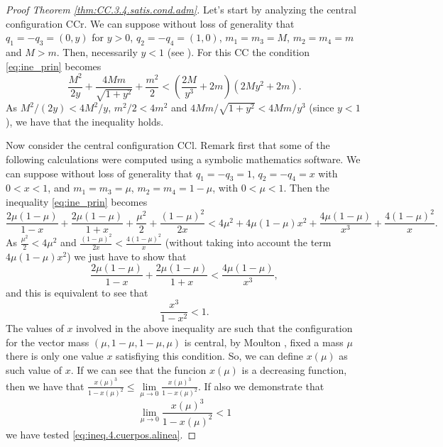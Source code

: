 \documentclass[twoside]{article}
\theoremstyle{remark}
\begin{document}
\begin{proof}[Proof Theorem \ref{thm:CC.3.4.satis.cond.adm}]

Let's start by analyzing the central configuration CCr. We can suppose without loss of generality that $ q_1 = -q_3 = (0, y) $ for $ y> 0 $, $ q_2 = -q_4 = (1,0) $, $ m_1 = m_3 = M $, $ m_2 = m_4 = m $ and $ M> m $. Then, necessarily $ y <1 $ (see \cite{perez2007convex}). For this CC  the condition \eqref{eq:ine_prin} becomes
\[\frac{M^2}{2y}+\frac{4Mm}{\sqrt{1+y^2}}+\frac{m^2}{2}<\left(\frac{2M}{y^3}+2m\right) \left(2My^2+2m\right).\]
As $M^2/(2y)<4M^2/y$, $m^2/2<4m^2$ and $4Mm/\sqrt{1+y^2}<4Mm/y^3$ (since $y<1$), we have that the inequality holds.

 Now consider the central configuration CCl.  Remark first that some of the following calculations were computed using a symbolic mathematics  software.  We can suppose without loss of generality that $q_1=-q_3=1$, $q_2=-q_4=x$ with $0<x<1$, and $m_1=m_3=\mu$, $m_2=m_4=1-\mu$, with $0<\mu<1$.  Then the inequality \eqref{eq:ine_prin} becomes
\[\frac{2\mu(1-\mu)}{1-x} +\frac{2\mu(1-\mu)}{1+x}+\frac{\mu^2}{2}+\frac{(1-\mu)^2}{2x}<4\mu^2+4\mu(1-\mu)x^2+\frac{4\mu(1-\mu)}{x^3}+\frac{4(1-\mu)^2}{x}.\]
As $ \frac{\mu ^ 2}{2} <4 \mu^2$ and $ \frac{(1-\mu)^2}{2x}< \frac{4(1-\mu)^2}{x} $ (without taking into account the term $4\mu(1- \mu)x^2$) we just have to show that
\[\frac{2\mu(1-\mu)}{1-x} +\frac{2\mu(1-\mu)}{1+x}<\frac{4\mu(1-\mu)}{x^3},\]
and this is equivalent to see that
\begin{equation}\label{eq:ineq.4.cuerpos.alinea}
\frac{x^3}{1-x^2}<1.
\end{equation}
The values of $x$ involved in the above inequality are such that the configuration for the vector mass $(\mu,1-\mu,1-\mu,\mu)$ is central, by Moulton \cite{moulton1910straight}, fixed a mass $\mu$ there is only one value $x$ satisfiying this condition. So, we can define $x(\mu)$ as such value of $x$. If we can see that the funcion $x(\mu)$ is a decreasing function, then we have that
$\frac{x(\mu)^3}{1-x(\mu)^2}\leq \lim\limits_{\mu\to 0}\frac{x(\mu)^3}{1-x(\mu)^2}.$
If also we demonstrate that 
\begin{equation}\label{eq:ineq.4.cuerpos.lim0}
\lim\limits_{\mu\to 0}\frac{x(\mu)^3}{1-x(\mu)^2}<1
\end{equation} 
we have tested \eqref {eq:ineq.4.cuerpos.alinea}. 


\end{proof}
\end{document}
